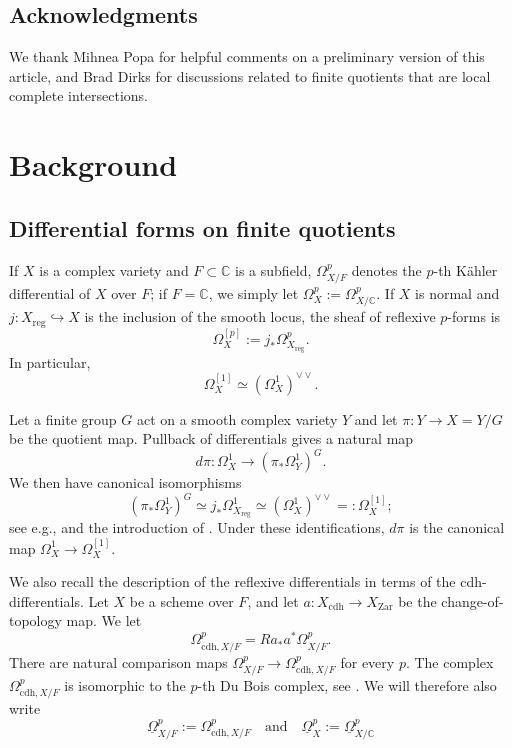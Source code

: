 \documentclass{amsart}
\theoremstyle{definition}
\newcommand{\CC}{\mathbb{C}}
\begin{document}
\subsection*{Acknowledgments} We thank Mihnea Popa for helpful comments on a preliminary version of this article, and Brad Dirks for discussions related to finite quotients that are local complete intersections.



\section{Background}


\subsection{Differential forms on finite quotients}
If $X$ is a complex variety and $F\subset \mathbb{C}$ is a subfield, $\Omega_{X/F}^p$ denotes the $p$-th K\"ahler differential of $X$ over $F$; if $F=\mathbb{C}$, we simply let $\Omega_X^p := \Omega_{X/\mathbb{C}}^p$. If $X$ is normal and $j\colon X_{\mathrm{reg}}\hookrightarrow X$ is the inclusion of the smooth locus, the sheaf of reflexive $p$-forms is
\[
\Omega_X^{[p]}:=j_*\Omega^p_{X_{\mathrm{reg}}}.
\]
In particular,
\[
\Omega_X^{[1]}\simeq(\Omega_X^1)^{\vee\vee}.
\]

Let a finite group $G$ act on a smooth complex variety $Y$ and let $\pi:Y\to X=Y/G$ be the quotient map. Pullback of differentials gives a natural map
\[
 d\pi:\Omega_X^1\longrightarrow(\pi_*\Omega_Y^1)^G.
\]
We then have canonical isomorphisms
\[
 (\pi_*\Omega_Y^1)^G
 \simeq j_*\Omega_{X_{\mathrm{reg}}}^1
 \simeq(\Omega_X^1)^{\vee\vee}
 =:\Omega_X^{[1]};
\]
see e.g., \cite[Lemma~1.8]{Steenbrink} and the introduction of \cite{Jamet}.  Under these identifications, $d\pi$ is the canonical map $\Omega^1_X\to\Omega^{[1]}_X$.

We also recall the description of the reflexive differentials in terms of the cdh-differentials. Let $X$ be a scheme over $F$, and let $a:X_{\mathrm{cdh}}\to X_{\mathrm{Zar}}$ be the change-of-topology map. We let
\[
    \Omega^p_{\mathrm{cdh},X/F}=Ra_*a^*\Omega^p_{X/F}.
\]
There are natural comparison maps $\Omega_{X/F}^p\to \Omega^p_{\mathrm{cdh},X/F}$ for every $p$. The complex $\Omega^p_{\mathrm{cdh},X/F}$ is isomorphic to the $p$-th Du Bois complex, see \cite[Lemma~2.1]{Shen2025}. We will therefore also write
\[
    \underline{\Omega}^p_{X/F}:=\Omega^p_{\mathrm{cdh},X/F}\quad\textrm{and}\quad\underline{\Omega}^p_{X}:=\underline{\Omega}^p_{X/\CC}
\]
\end{document}
